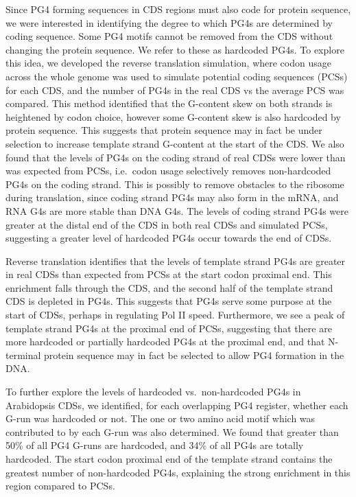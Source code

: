 \documentclass[12pt,a4paper,]{report}
\begin{document}
Since PG4 forming sequences in CDS regions must also code for protein
sequence, we were interested in identifying the degree to which PG4s are
determined by coding sequence. Some PG4 motifs cannot be removed from
the CDS without changing the protein sequence. We refer to these as
hardcoded PG4s. To explore this idea, we developed the reverse
translation simulation, where codon usage across the whole genome was
used to simulate potential coding sequences (PCSs) for each CDS, and the
number of PG4s in the real CDS vs the average PCS was compared. This
method identified that the G-content skew on both strands is heightened
by codon choice, however some G-content skew is also hardcoded by
protein sequence. This suggests that protein sequence may in fact be
under selection to increase template strand G-content at the start of
the CDS. We also found that the levels of PG4s on the coding strand of
real CDSs were lower than was expected from PCSs, i.e.~codon usage
selectively removes non-hardcoded PG4s on the coding strand. This is
possibly to remove obstacles to the ribosome during translation, since
coding strand PG4s may also form in the mRNA, and RNA G4s are more
stable than DNA G4s. The levels of coding strand PG4s were greater at
the distal end of the CDS in both real CDSs and simulated PCSs,
suggesting a greater level of hardcoded PG4s occur towards the end of
CDSs.

Reverse translation identifies that the levels of template strand PG4s
are greater in real CDSs than expected from PCSs at the start codon
proximal end. This enrichment falls through the CDS, and the second half
of the template strand CDS is depleted in PG4s. This suggests that PG4s
serve some purpose at the start of CDSs, perhaps in regulating Pol II
speed. Furthermore, we see a peak of template strand PG4s at the
proximal end of PCSs, suggesting that there are more hardcoded or
partially hardcoded PG4s at the proximal end, and that N-terminal
protein sequence may in fact be selected to allow PG4 formation in the
DNA.

To further explore the levels of hardcoded vs.~non-hardcoded PG4s in
Arabidopsis CDSs, we identified, for each overlapping PG4 register,
whether each G-run was hardcoded or not. The one or two amino acid motif
which was contributed to by each G-run was also determined. We found
that greater than 50\% of all PG4 G-runs are hardcoded, and 34\% of all
PG4s are totally hardcoded. The start codon proximal end of the template
strand contains the greatest number of non-hardcoded PG4s, explaining
the strong enrichment in this region compared to PCSs.
\end{document}
